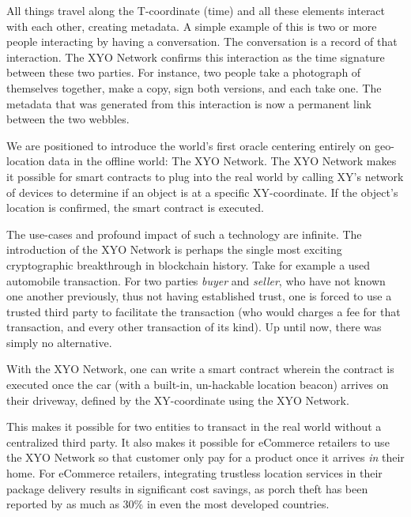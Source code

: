 \documentclass{article}
\begin{document}
All things travel along the T-coordinate (time) and all these elements interact with each other, creating metadata. A simple example of this is two or more people interacting by having a conversation. The conversation is a record of that interaction. The XYO Network confirms this interaction as the time signature between these two parties. For instance, two people take a photograph of themselves together, make a copy, sign both versions, and each take one. The metadata that was generated from this interaction is now a permanent link between the two \Glspl{webble}.

We are positioned to introduce the world's first oracle centering entirely on geo-location data in the offline world: The XYO Network. The XYO Network makes it possible for smart contracts to plug into the real world by calling XY's network of devices to determine if an object is at a specific XY-coordinate. If the object’s location is confirmed, the smart contract is executed. 

The use-cases and profound impact of such a technology are infinite. The introduction of the XYO Network is perhaps the single most exciting cryptographic breakthrough in blockchain history. Take for example a used automobile transaction. For two parties \textit{buyer} and \textit{seller}, who have not known one another previously, thus not having established trust, one is forced to use a trusted third party to facilitate the transaction (who would charges a fee for that transaction, and every other transaction of its kind). Up until now, there was simply no alternative. 

With the XYO Network, one can write a smart contract wherein the contract is executed once the car (with a built-in, un-hackable location beacon) arrives on their driveway, defined by the XY-coordinate using the XYO Network.

This makes it possible for two entities to transact in the real world without a centralized third party. It also makes it possible for eCommerce retailers to use the XYO Network so that customer only pay for a product once it arrives \textit{in} their home. For eCommerce retailers, integrating trustless location services in their package delivery results in significant cost savings, as porch theft has been reported by as much as 30\% in even the most developed countries.
\end{document}
